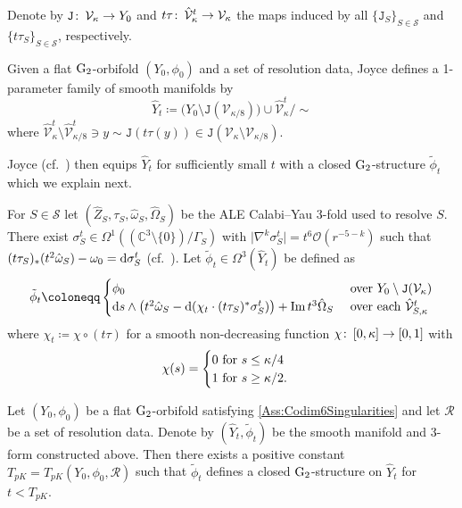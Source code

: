 \documentclass[11pt,a4paper]{scrartcl}
\newcommand*\diff{\mathop{}\!\textup{d}}
\newcommand{\col}{\colon \thinspace}
\newcommand{\im}{\textup{Im}\thinspace }
\newcommand{\G}{\textup{G}}
\numberwithin{equation}{section}
\theoremstyle{plain}
\theoremstyle{definition}
\theoremstyle{remark}
\begin{document}
Denote by $\mathtt{J} \col \mathcal{V}_{\kappa} \to Y_0$ and $t \tau \col \hat{\mathcal{V}}_{\kappa}^t \to \mathcal{V}_{\kappa}$ the maps induced by all $\{\mathtt{J}_S\}_{S\in \mathcal{S}}$ and $\{t\tau_S\}_{S \in \mathcal{S}}$, respectively. 

\begin{definition}\label{def:OrbifoldResolution}
Given a flat $\G_2$-orbifold $(Y_0,\phi_0)$ and a set of resolution data, Joyce defines a 1-parameter family of smooth manifolds by \[\hat{Y}_t \coloneqq \big(Y_0 \setminus \mathtt{J}(\mathcal{V}_{\kappa/8})\big) \cup \hat{\mathcal{V}}_{\kappa}^t/\sim \] where $\hat{\mathcal{V}}_{\kappa}^t\setminus \hat{\mathcal{V}}_{\kappa/8}^t \ni y \sim \mathtt{J}(t\tau(y)) \in \mathtt{J}(\mathcal{V}_{\kappa}\setminus \mathcal{V}_{\kappa/8})$.
\end{definition}

Joyce (cf.~\cite[Proof of Theorem~2.2.1]{Joyce-GeneralisedKummer2}) then equips $\hat{Y}_t$ for sufficiently small $t$ with a closed $\G_2$-structure $\tilde{\phi}_t$ which we explain next.

For $S\in \mathcal{S}$ let $(\hat{Z}_S,\tau_S,\hat{\omega}_S,\hat{\Omega}_S)$ be the ALE Calabi--Yau 3-fold used to resolve $S$. There exist $\sigma_S^t \in \Omega^1((\mathbb{C}^3\setminus \{0\})/\Gamma_S)$ with $ \vert \nabla^k \sigma_S^t \vert = t^{6}\mathcal{O}(r^{-5-k})$ such that $(t\tau_S)_* (t^2\hat{\omega}_S) - \omega_0 = \diff \sigma_S^t$ (cf.~\cite[Theorem~8.2.3]{Joyce-Black}). Let $\tilde{\phi}_t \in \Omega^3(\hat{Y}_t)$ be defined as  
\begin{align*}
\tilde{\phi}_t \coloneqq 
\begin{cases}
\phi_0 &\textup{ over $Y_0\setminus \mathtt{J}(\mathcal{V}_{\kappa})$} \\
\diff s \wedge \big(t^2 \hat{\omega}_S - \diff (\chi_t \cdot (t\tau_S)^*\sigma_S^t)\big) +  \im t^3 \hat{\Omega}_S &\textup{ over each $\hat{\mathcal{V}}_{S,\kappa}^t$}
\end{cases}
\end{align*}
where $\chi_t \coloneqq \chi \circ (t\tau)$ for a smooth non-decreasing function $\chi \col [0,\kappa] \to [0,1]$ with 
\begin{align*}
\chi(s) = \begin{cases}
0 \textup{ for $s \leq \kappa/4$}\\
1 \textup{ for $s \geq \kappa/2$.}
\end{cases}
\end{align*}
\begin{proposition}
Let $(Y_0,\phi_0)$ be a flat $\G_2$-orbifold satisfying \autoref{Ass:Codim6Singularities} and let $\mathcal{R}$ be a set of resolution data. Denote by $(\hat{Y}_t,\tilde{\phi}_t)$ be the smooth manifold and $3$-form constructed above. Then there exists a positive constant $T_{pK} = T_{pK}(Y_0,\phi_0,\mathcal{R})$ such that $\tilde{\phi}_t$ defines a closed $\G_2$-structure on $\hat{Y}_t$ for $t<T_{pK}$.
\end{proposition}
\end{document}
